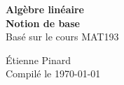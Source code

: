 \documentclass[11pt]{article}
\theoremstyle{plain}
\theoremstyle{definition}
\theoremstyle{remark}
\begin{document}
\shorthandoff{:}

\begin{titlepage}
  \centering
  \vspace*{3in}

  \vspace*{0.5cm}

  \Huge
  \textmd{\textbf{Algèbre linéaire}}\\
  \vspace{0.1in} \LARGE \textmd{\textbf{Notion de base}} \\
  \vspace{0.1in}\large{Basé sur le cours MAT193}

  \vspace*{\fill}
  \large Étienne Pinard \\
  Compilé le \today

\end{titlepage}

\pagebreak

\tableofcontents








\end{document}
